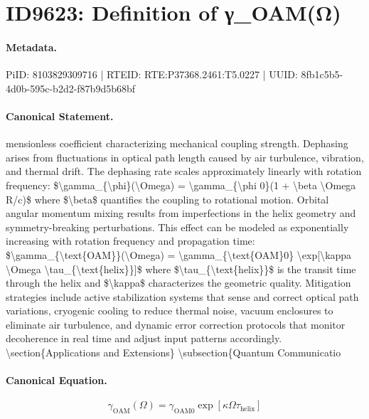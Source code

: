 \section*{ID9623: Definition of γ\_OAM(Ω)}
\paragraph{Metadata.}
PiID: 8103829309716 | RTEID: RTE:P37368.2461:T5.0227 | UUID: 8fb1c5b5-4d0b-595c-b2d2-f87b9d5b68bf

\paragraph{Canonical Statement.}
mensionless coefficient characterizing mechanical coupling strength. Dephasing arises from fluctuations in optical path length caused by air turbulence, vibration, and thermal drift. The dephasing rate scales approximately linearly with rotation frequency: \$\textbackslash{}gamma\_\{\textbackslash{}phi\}(\textbackslash{}Omega) = \textbackslash{}gamma\_\{\textbackslash{}phi 0\}(1 + \textbackslash{}beta \textbackslash{}Omega R/c)\$ where \$\textbackslash{}beta\$ quantifies the coupling to rotational motion. Orbital angular momentum mixing results from imperfections in the helix geometry and symmetry-breaking perturbations. This effect can be modeled as exponentially increasing with rotation frequency and propagation time: \$\textbackslash{}gamma\_\{\textbackslash{}text\{OAM\}\}(\textbackslash{}Omega) = \textbackslash{}gamma\_\{\textbackslash{}text\{OAM\}0\} \textbackslash{}exp[\textbackslash{}kappa \textbackslash{}Omega \textbackslash{}tau\_\{\textbackslash{}text\{helix\}\}]\$ where \$\textbackslash{}tau\_\{\textbackslash{}text\{helix\}\}\$ is the transit time through the helix and \$\textbackslash{}kappa\$ characterizes the geometric quality. Mitigation strategies include active stabilization systems that sense and correct optical path variations, cryogenic cooling to reduce thermal noise, vacuum enclosures to eliminate air turbulence, and dynamic error correction protocols that monitor decoherence in real time and adjust input patterns accordingly. \textbackslash{}section\{Applications and Extensions\} \textbackslash{}subsection\{Quantum Communicatio

\paragraph{Canonical Equation.}
\[
\gamma_{\text{OAM}}(\Omega) = \gamma_{\text{OAM}0} \exp[\kappa \Omega \tau_{\text{helix}}]
\]

